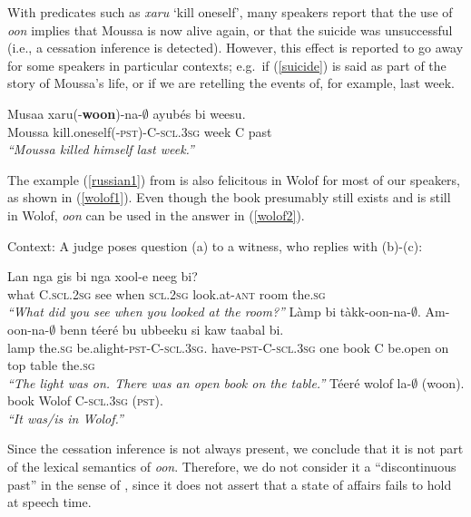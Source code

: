 \documentclass[output=paper
,modfonts
,nonflat]{langsci/langscibook}
\begin{document}
With predicates such as \textit{xaru} `kill oneself', many speakers
report that the use of \textit{oon} implies that Moussa is now alive
again, or that the suicide was unsuccessful (i.e., a cessation
inference is detected). However, this effect is reported to go away
for some speakers in
particular contexts; e.g.~if
(\ref{suicide}) is said as part of the story of Moussa's life, or if
we are retelling the events of, for example, last week.

\ea\label{suicide}
\gll Musaa xaru(-\textbf{woon})-na-$\emptyset$ ayub\'es bi weesu.\\
Moussa kill.oneself\textsc{(-pst)-C-scl.3sg} week C past\\
\glt \textit{``Moussa killed himself last week.''}
\z

The example (\ref{russian1}) from \cite{klein94time} is also felicitous in Wolof for most
of our speakers, as shown in (\ref{wolof1}). Even though the book
presumably still exists and is still in Wolof,  \textit{oon} can be
used in the answer in (\ref{wolof2}).

  \begin{exe}
\ex\label{wolof1} Context: A judge poses question (a) to a witness, who replies with (b)-(c):
\begin{xlist}
\ex 
\gll Lan nga gis bi nga xool-e neeg bi?\\
what C.\textsc{scl.2sg} see when \textsc{scl.2sg} look.at-\textsc{ant} room the.\textsc{sg}\\
\glt\textit{``What did you see when you looked at the room?''}
\ex
\gll L\`amp bi t\`akk-oon-na-$\emptyset$. Am-oon-na-$\emptyset$ benn t\'eer\'e bu ubbeeku si kaw taabal bi.\\
lamp the.\textsc{sg}
be.alight-\textsc{pst}-C-\textsc{scl.3sg}. have-\textsc{pst}-C-\textsc{scl.3sg}
one book C be.open on top table the.\textsc{sg}\\
\glt\textit{``The light was on. There was an open book on the table.''}
\ex
\gll T\'eer\'e wolof la-$\emptyset$ (woon).\\
book Wolof C-\textsc{scl.3sg} (\textsc{pst}).\\
\glt \textit{``It was/is in Wolof.''}\label{wolof2}

\end{xlist}
\end{exe}



Since the cessation inference is not always present, we conclude that it is not part of the lexical semantics of \textit{oon}. Therefore, we do not consider it a ``discontinuous past'' in the sense of \citet{plungian06towards}, since it does not assert that a state of affairs fails to hold at speech time.
\end{document}
